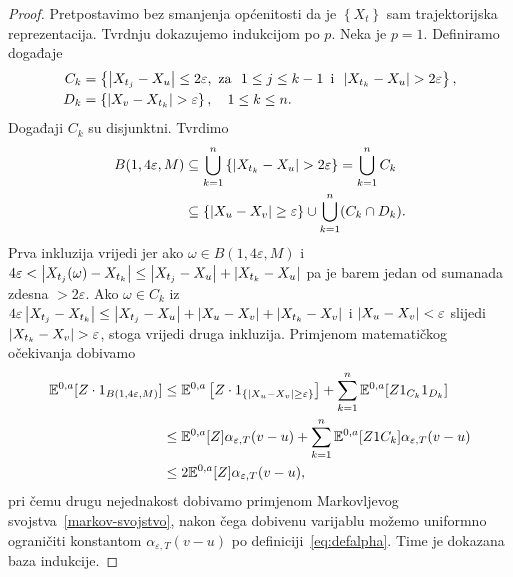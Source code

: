 \documentclass[main.tex]{subfiles}
\begin{document}
\begin{proof}
	Pretpostavimo bez smanjenja općenitosti da je \( \left\{ X_t \right\} \) sam trajektorijska reprezentacija. Tvrdnju dokazujemo indukcijom po \( p \).
	Neka je \( p=1 \). Definiramo događaje
	\begin{align}
		C_k & = \left\{ \abs{X_{t_j}-X_u} \le 2\varepsilon, \text{\ za \ }  1 \le j \le k-1  \text{\, i \,} \abs{X_{t_k} - X_u} > 2\varepsilon \right\}, \\
		D_k & = \left\{ \abs{X_v - X_{t_k}} > \varepsilon \right\}, \quad 1 \le k \le n.
	\end{align}
	Događaji \( C_k \) su disjunktni. Tvrdimo
	\begin{equation}
		\begin{aligned}
			B(1, 4\varepsilon, M) & \subseteq \bigcup_{k=1}^n \left\{ \left| {X_{t_k}-X_u} \right| > 2\varepsilon  \right\} = \bigcup_{k=1}^n C_k \\
			                      & \subseteq \left\{ \left| {X_u-X_v} \right| \ge \varepsilon  \right\} \cup \bigcup_{k=1}^n (C_k \cap D_k).
		\end{aligned}
	\end{equation}
	Prva inkluzija vrijedi jer ako \( \omega \in  B(1, 4\varepsilon, M) \) i \( 4\varepsilon < \left| {X_{t_j}(\omega)-X_{t_k}} \right| \le \left| {X_{t_j}-X_u} \right| + \left| {X_{t_k}-X_u} \right| \)
	pa je barem jedan od sumanada zdesna \( > 2\varepsilon \). Ako \( \omega \in C_k \) iz \( 4\varepsilon \left| {X_{t_j}-X_{t_k}} \right| \le \left| {X_{t_j}-X_u} \right| + \left| {X_u-X_v} \right| + \left| {X_{t_k}-X_v} \right|  \)
	i \( \left| {X_u-X_v} \right| < \varepsilon \) slijedi \( \left| {X_{t_k} - X_v} \right| > \varepsilon \), stoga vrijedi druga inkluzija. Primjenom matematičkog očekivanja dobivamo
	\begin{equation}
		\begin{aligned}
			\mathbb{E}^{0,a}[Z \cdot 1_{B(1, 4\varepsilon, M)}] & \le \mathbb{E}^{0,a}\left[Z \cdot 1_{\left\{ \left| {X_u-X_v} \right| \ge \varepsilon \right\}}\right] +
			\sum_{k=1}^n \mathbb{E}^{0,a}[Z 1_{C_k} 1_{D_k}]                                                                                                               \\
			                                            & \le \mathbb{E}^{0,a} [Z] \alpha_{\varepsilon, T}(v-u) + \sum_{k=1}^n \mathbb{E}^{0,a}[Z1C_k]\alpha_{\varepsilon, T}(v-u) \\
			                                            & \le 2 \mathbb{E}^{0,a} [Z] \alpha_{\varepsilon, T}(v-u),
		\end{aligned}
	\end{equation}
	pri čemu drugu nejednakost dobivamo primjenom Markovljevog svojstva~\eqref{markov-svojstvo}, nakon čega
	dobivenu varijablu možemo uniformno ograničiti konstantom \( \alpha_{\varepsilon, T}(v-u) \) po definiciji~\eqref{eq:defalpha}. Time je dokazana baza indukcije.


\end{proof}
\end{document}
